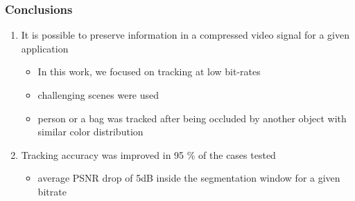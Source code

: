 \begin{frame}\frametitle{Conclusions} \logoCSIPCPL\mypagenum
	\begin{enumerate}
		\item It is possible to preserve information in a compressed video signal for a given application
			\begin{itemize}
				\item In this work, we focused on tracking at low bit-rates
				\item challenging scenes were used
				\item person or a bag was tracked after being occluded by another object with similar color distribution
			\end{itemize}
		\item Tracking accuracy was improved in 95 \% of the cases tested
			\begin{itemize}
				\item average PSNR drop of 5dB inside the segmentation window for a given bitrate
			\end{itemize}
	\end{enumerate}
\end{frame}






%
%
%
%
